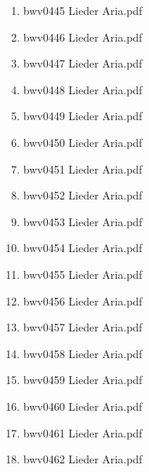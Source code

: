 \documentclass[11pt]{article}
\begin{document}
\begin{enumerate}
\begin{enumerate}
\begin{enumerate}
\item bwv0445   Lieder Aria.pdf
\label{sec-1-1-1-1-44-6-7-4-7}

\item bwv0446   Lieder Aria.pdf
\label{sec-1-1-1-1-44-6-7-4-8}

\item bwv0447   Lieder Aria.pdf
\label{sec-1-1-1-1-44-6-7-4-9}

\item bwv0448   Lieder Aria.pdf
\label{sec-1-1-1-1-44-6-7-4-10}

\item bwv0449   Lieder Aria.pdf
\label{sec-1-1-1-1-44-6-7-4-11}

\item bwv0450   Lieder Aria.pdf
\label{sec-1-1-1-1-44-6-7-4-12}

\item bwv0451   Lieder Aria.pdf
\label{sec-1-1-1-1-44-6-7-4-13}

\item bwv0452   Lieder Aria.pdf
\label{sec-1-1-1-1-44-6-7-4-14}

\item bwv0453   Lieder Aria.pdf
\label{sec-1-1-1-1-44-6-7-4-15}

\item bwv0454   Lieder Aria.pdf
\label{sec-1-1-1-1-44-6-7-4-16}

\item bwv0455   Lieder Aria.pdf
\label{sec-1-1-1-1-44-6-7-4-17}

\item bwv0456   Lieder Aria.pdf
\label{sec-1-1-1-1-44-6-7-4-18}

\item bwv0457   Lieder Aria.pdf
\label{sec-1-1-1-1-44-6-7-4-19}

\item bwv0458   Lieder Aria.pdf
\label{sec-1-1-1-1-44-6-7-4-20}

\item bwv0459   Lieder Aria.pdf
\label{sec-1-1-1-1-44-6-7-4-21}

\item bwv0460   Lieder Aria.pdf
\label{sec-1-1-1-1-44-6-7-4-22}

\item bwv0461   Lieder Aria.pdf
\label{sec-1-1-1-1-44-6-7-4-23}

\item bwv0462   Lieder Aria.pdf
\label{sec-1-1-1-1-44-6-7-4-24}


\end{enumerate}
\end{enumerate}
\end{enumerate}
\end{document}
